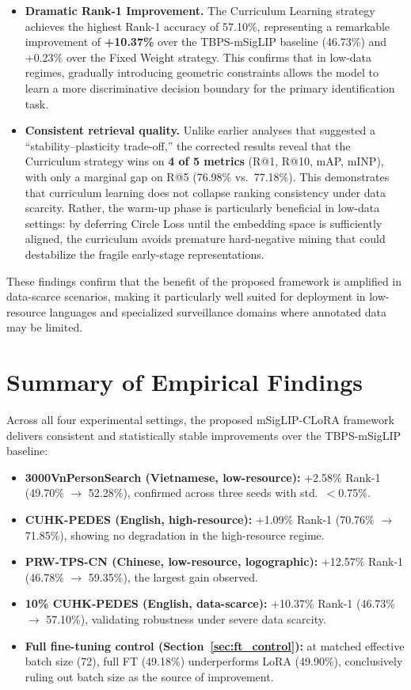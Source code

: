\documentclass[../main.tex]{subfiles}
\begin{document}
\begin{itemize}
    \item \textbf{Dramatic Rank-1 Improvement.} The Curriculum Learning strategy achieves the highest Rank-1 accuracy of 57.10\%, representing a remarkable improvement of \textbf{+10.37\%} over the TBPS-mSigLIP baseline (46.73\%) and +0.23\% over the Fixed Weight strategy. This confirms that in low-data regimes, gradually introducing geometric constraints allows the model to learn a more discriminative decision boundary for the primary identification task.

    \item \textbf{Consistent retrieval quality.} Unlike earlier analyses that suggested a ``stability--plasticity trade-off,'' the corrected results reveal that the Curriculum strategy wins on \textbf{4 of 5 metrics} (R@1, R@10, mAP, mINP), with only a marginal gap on R@5 (76.98\% vs.\ 77.18\%). This demonstrates that curriculum learning does not collapse ranking consistency under data scarcity. Rather, the warm-up phase is particularly beneficial in low-data settings: by deferring Circle Loss until the embedding space is sufficiently aligned, the curriculum avoids premature hard-negative mining that could destabilize the fragile early-stage representations.
\end{itemize}

\noindent These findings confirm that the benefit of the proposed framework is amplified in data-scarce scenarios, making it particularly well suited for deployment in low-resource languages and specialized surveillance domains where annotated data may be limited.

\section{Summary of Empirical Findings}

\noindent Across all four experimental settings, the proposed mSigLIP-CLoRA framework delivers consistent and statistically stable improvements over the TBPS-mSigLIP baseline:

\begin{itemize}
    \item \textbf{3000VnPersonSearch (Vietnamese, low-resource):} +2.58\% Rank-1 (49.70\% $\to$ 52.28\%), confirmed across three seeds with std.\ $<$0.75\%.
    \item \textbf{CUHK-PEDES (English, high-resource):} +1.09\% Rank-1 (70.76\% $\to$ 71.85\%), showing no degradation in the high-resource regime.
    \item \textbf{PRW-TPS-CN (Chinese, low-resource, logographic):} +12.57\% Rank-1 (46.78\% $\to$ 59.35\%), the largest gain observed.
    \item \textbf{10\% CUHK-PEDES (English, data-scarce):} +10.37\% Rank-1 (46.73\% $\to$ 57.10\%), validating robustness under severe data scarcity.
    \item \textbf{Full fine-tuning control (Section~\ref{sec:ft_control}):} at matched effective batch size (72), full FT (49.18\%) underperforms LoRA (49.90\%), conclusively ruling out batch size as the source of improvement.
\end{itemize}
\end{document}
